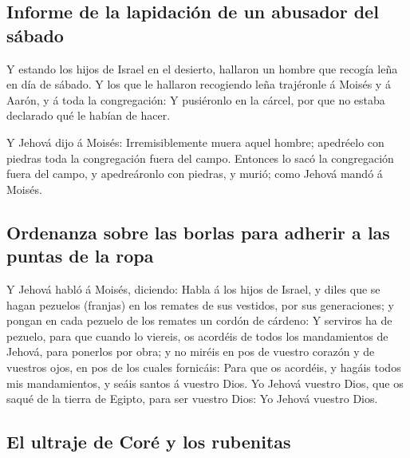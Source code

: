 \hypertarget{informe-de-la-lapidaciuxf3n-de-un-abusador-del-suxe1bado}{%
\subsection{Informe de la lapidación de un abusador del
sábado}\label{informe-de-la-lapidaciuxf3n-de-un-abusador-del-suxe1bado}}

 Y estando los hijos de Israel en el desierto, hallaron
un hombre que recogía leña en día de sábado.  Y los que
le hallaron recogiendo leña trajéronle á Moisés y á Aarón, y á toda la
congregación:  Y pusiéronlo en la cárcel, por que no
estaba declarado qué le habían de hacer.

 Y Jehová dijo á Moisés: Irremisiblemente muera aquel
hombre; apedréelo con piedras toda la congregación fuera del campo.
 Entonces lo sacó la congregación fuera del campo, y
apedreáronlo con piedras, y murió; como Jehová mandó á Moisés.

\hypertarget{ordenanza-sobre-las-borlas-para-adherir-a-las-puntas-de-la-ropa}{%
\subsection{Ordenanza sobre las borlas para adherir a las puntas de la
ropa}\label{ordenanza-sobre-las-borlas-para-adherir-a-las-puntas-de-la-ropa}}

 Y Jehová habló á Moisés, diciendo:  Habla
á los hijos de Israel, y diles que se hagan pezuelos (franjas) en los
remates de sus vestidos, por sus generaciones; y pongan en cada pezuelo
de los remates un cordón de cárdeno:  Y serviros ha de
pezuelo, para que cuando lo viereis, os acordéis de todos los
mandamientos de Jehová, para ponerlos por obra; y no miréis en pos de
vuestro corazón y de vuestros ojos, en pos de los cuales fornicáis:
 Para que os acordéis, y hagáis todos mis mandamientos, y
seáis santos á vuestro Dios.  Yo Jehová vuestro Dios, que
os saqué de la tierra de Egipto, para ser vuestro Dios: Yo Jehová
vuestro Dios.

\hypertarget{el-ultraje-de-coruxe9-y-los-rubenitas}{%
\subsection{El ultraje de Coré y los
rubenitas}\label{el-ultraje-de-coruxe9-y-los-rubenitas}}

